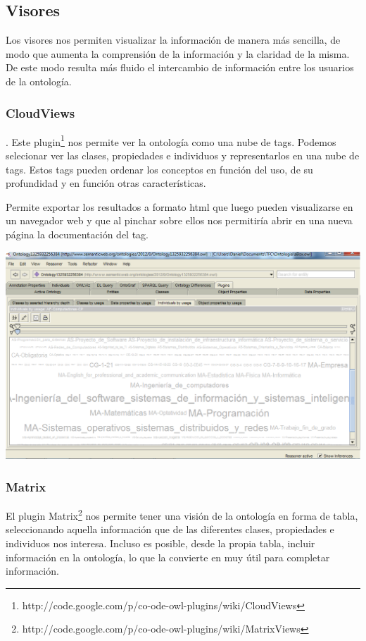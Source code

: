 \subsection{Visores}

Los visores nos permiten visualizar la información de manera más sencilla, de modo que aumenta la comprensión de la información y la claridad de la misma. De este modo resulta más fluido el intercambio de información entre los usuarios de la ontología.

\subsubsection{CloudViews}. Este plugin\footnote{http://code.google.com/p/co-ode-owl-plugins/wiki/CloudViews} nos permite ver la ontología como una nube de tags. Podemos selecionar ver las clases, propiedades e individuos y representarlos en una nube de tags. Estos tags pueden ordenar los conceptos en función del uso, de su profundidad y en función otras características.

Permite exportar los resultados a formato html que luego pueden visualizarse en un navegador web y que al pinchar sobre ellos nos permitiría abrir en una nueva página la documentación del tag.

\begin{center}
		\includegraphics[width=1.00\textwidth]{Imagenes/Herramientas-cloudview.png}
\end{center}

\subsubsection{Matrix} El plugin Matrix\footnote{http://code.google.com/p/co-ode-owl-plugins/wiki/MatrixViews} nos permite tener una visión de la ontología en forma de tabla, seleccionando aquella información que de las diferentes clases, propiedades e individuos nos interesa. Incluso es posible, desde la propia tabla, incluir información en la ontología, lo que la convierte en muy útil para completar información.

